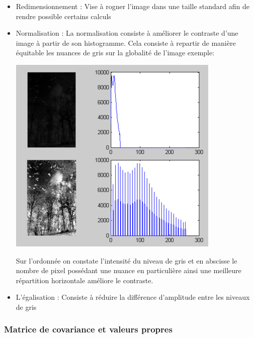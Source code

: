 \documentclass[12pt,a4paper]{article}
\begin{document}
\begin{itemize}
	
\item Redimensionnement : Vise à rogner l'image dans une taille standard afin de rendre possible certains calculs\\

\item Normalisation : La normalisation consiste à améliorer le contraste d'une image à partir de son histogramme. Cela consiste à repartir de manière équitable les nuances de gris sur la globalité de l'image 
exemple: \\
\begin{center}
\vspace{0.8cm}
\includegraphics[scale=0.5]{Pictures/normalisation.png} 
\end{center}


Sur l'ordonnée on constate l'intensité du niveau de gris et en abscisse le nombre de pixel possédant une nuance en particulière ainsi une meilleure répartition horizontale améliore le contraste.\\

\item L'égalisation : Consiste à réduire la différence d'amplitude entre les niveaux de gris\\

\end{itemize}

\subsubsection{Matrice de covariance et valeurs propres}
\end{document}
